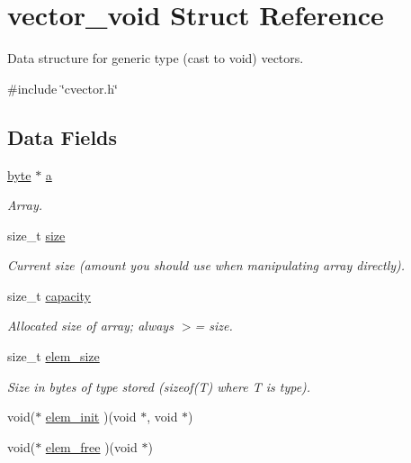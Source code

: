 \hypertarget{structvector__void}{\section{vector\-\_\-void Struct Reference}
\label{structvector__void}
}


Data structure for generic type (cast to void) vectors.  




{\ttfamily \#include \char`\"{}cvector.\-h\char`\"{}}

\subsection*{Data Fields}
\begin{DoxyCompactItemize}
\item 
\hyperlink{cvector_8h_a0c8186d9b9b7880309c27230bbb5e69d}{byte} $\ast$ \hyperlink{structvector__void_abf49d3804780c25501484e2f916f3953}{a}
\begin{DoxyCompactList}\small\item\em Array. \end{DoxyCompactList}\item 
size\-\_\-t \hyperlink{structvector__void_a94e09482f6122993461724a988ae6f92}{size}
\begin{DoxyCompactList}\small\item\em Current size (amount you should use when manipulating array directly). \end{DoxyCompactList}\item 
size\-\_\-t \hyperlink{structvector__void_a440146243caeb1d285111fdd54e1006f}{capacity}
\begin{DoxyCompactList}\small\item\em Allocated size of array; always $>$= size. \end{DoxyCompactList}\item 
size\-\_\-t \hyperlink{structvector__void_afedda26ce85492462b79dae9090c49f6}{elem\-\_\-size}
\begin{DoxyCompactList}\small\item\em Size in bytes of type stored (sizeof(\-T) where T is type). \end{DoxyCompactList}\item 
void($\ast$ \hyperlink{structvector__void_af5d27d7e1af89d5dfbcf49f1810cc0c2}{elem\-\_\-init} )(void $\ast$, void $\ast$)
\item 
void($\ast$ \hyperlink{structvector__void_abed2ac06e76256419b825b31e879b204}{elem\-\_\-free} )(void $\ast$)
\end{DoxyCompactItemize}


